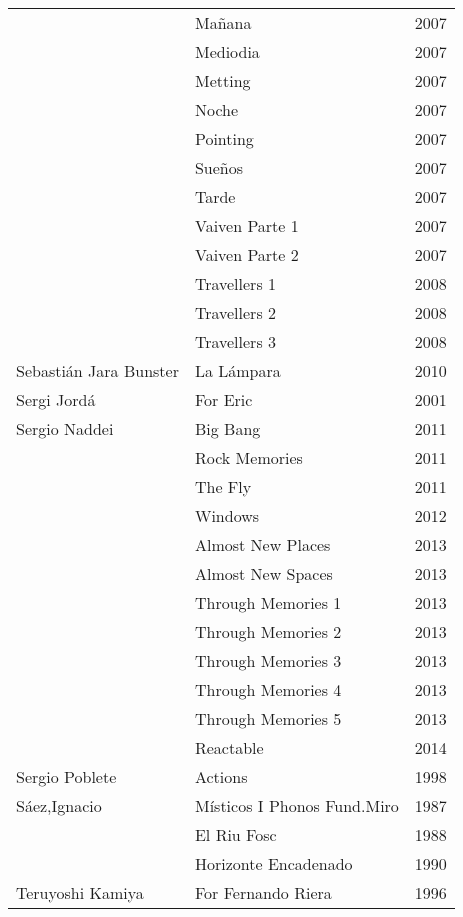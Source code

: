 \begin{center}
\begin{longtable}{ p{}  p{}  p{} }
& Mañana & 2007 \\ \cmidrule (r){2-3} 
& Mediodia & 2007 \\ \cmidrule (r){2-3} 
& Metting & 2007 \\ \cmidrule (r){2-3} 
& Noche & 2007 \\ \cmidrule (r){2-3} 
& Pointing & 2007 \\ \cmidrule (r){2-3} 
& Sueños & 2007 \\ \cmidrule (r){2-3} 
& Tarde & 2007 \\ \cmidrule (r){2-3} 
& Vaiven Parte 1 & 2007 \\ \cmidrule (r){2-3} 
& Vaiven Parte 2 & 2007 \\ \cmidrule (r){2-3} 
& Travellers 1 & 2008 \\ \cmidrule (r){2-3} 
& Travellers 2 & 2008 \\ \cmidrule (r){2-3} 
& Travellers 3 & 2008 \\ \midrule
Sebastián Jara Bunster & La Lámpara & 2010 \\ \midrule 
Sergi Jordá & For Eric & 2001 \\ \midrule 
Sergio Naddei & Big Bang & 2011 \\ \cmidrule (r){2-3} 
& Rock Memories & 2011 \\ \cmidrule (r){2-3} 
& The Fly & 2011 \\ \cmidrule (r){2-3} 
& Windows & 2012 \\ \cmidrule (r){2-3} 
& Almost New Places & 2013 \\ \cmidrule (r){2-3} 
& Almost New Spaces & 2013 \\ \cmidrule (r){2-3} 
& Through Memories 1 & 2013 \\ \cmidrule (r){2-3} 
& Through Memories 2 & 2013 \\ \cmidrule (r){2-3} 
& Through Memories 3 & 2013 \\ \cmidrule (r){2-3} 
& Through Memories 4 & 2013 \\ \cmidrule (r){2-3} 
& Through Memories 5 & 2013 \\ \cmidrule (r){2-3} 
& Reactable & 2014 \\ \midrule 
Sergio Poblete & Actions & 1998 \\ \midrule 
Sáez,Ignacio & Místicos I Phonos Fund.Miro & 1987 \\ \cmidrule (r){2-3} 
& El Riu Fosc & 1988 \\ \cmidrule (r){2-3} 
& Horizonte Encadenado & 1990 \\ \midrule 
Teruyoshi Kamiya & For Fernando Riera & 1996 \\ \cmidrule (r){2-3} 

\end{longtable}
\end{center}
